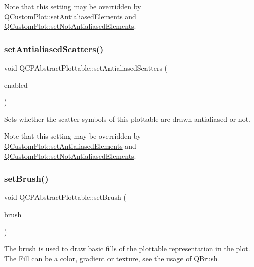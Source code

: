 Note that this setting may be overridden by \mbox{\hyperlink{class_q_custom_plot_af6f91e5eab1be85f67c556e98c3745e8}{Q\+Custom\+Plot\+::set\+Antialiased\+Elements}} and \mbox{\hyperlink{class_q_custom_plot_ae10d685b5eabea2999fb8775ca173c24}{Q\+Custom\+Plot\+::set\+Not\+Antialiased\+Elements}}. \mbox{\label{class_q_c_p_abstract_plottable_a2f03f067ede2ed4da6f7d0e4777a3f02}} 
\subsubsection{\texorpdfstring{setAntialiasedScatters()}{setAntialiasedScatters()}}
{\footnotesize\ttfamily void Q\+C\+P\+Abstract\+Plottable\+::set\+Antialiased\+Scatters (\begin{DoxyParamCaption}\item[{bool}]{enabled }\end{DoxyParamCaption})}

Sets whether the scatter symbols of this plottable are drawn antialiased or not.

Note that this setting may be overridden by \mbox{\hyperlink{class_q_custom_plot_af6f91e5eab1be85f67c556e98c3745e8}{Q\+Custom\+Plot\+::set\+Antialiased\+Elements}} and \mbox{\hyperlink{class_q_custom_plot_ae10d685b5eabea2999fb8775ca173c24}{Q\+Custom\+Plot\+::set\+Not\+Antialiased\+Elements}}. \mbox{\label{class_q_c_p_abstract_plottable_a7a4b92144dca6453a1f0f210e27edc74}} 
\subsubsection{\texorpdfstring{setBrush()}{setBrush()}}
{\footnotesize\ttfamily void Q\+C\+P\+Abstract\+Plottable\+::set\+Brush (\begin{DoxyParamCaption}\item[{const Q\+Brush \&}]{brush }\end{DoxyParamCaption})}

The brush is used to draw basic fills of the plottable representation in the plot. The Fill can be a color, gradient or texture, see the usage of Q\+Brush.

